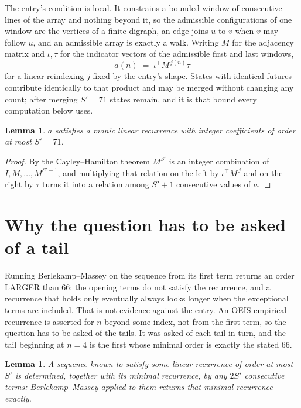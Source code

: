 \documentclass[11pt,a4paper]{article}
\theoremstyle{plain}
\newtheorem{lemma}[theorem]{Lemma}
\theoremstyle{definition}
\begin{document}
The entry's condition is local. It constrains a bounded window of consecutive lines of the
array and nothing beyond it, so the admissible configurations of one window are the vertices of
a finite digraph, an edge joins $u$ to $v$ when $v$ may follow $u$, and an admissible array is
exactly a walk. Writing $M$ for the adjacency matrix and $\iota,\tau$ for the indicator vectors
of the admissible first and last windows,
\[
a(n)\;=\;\iota^{\!\top}M^{\,j(n)}\tau
\]
for a linear reindexing $j$ fixed by the entry's shape. States with identical futures
contribute identically to that product and may be merged without changing any count; after
merging $S'=71$ states remain, and it is that bound every computation below uses.

\begin{lemma}\label{lem:cf}
$a$ satisfies a monic linear recurrence with integer coefficients of order at most $S'=71$.
\end{lemma}

\begin{proof}
By the Cayley--Hamilton theorem $M^{S'}$ is an integer combination of $I,M,\dots,M^{S'-1}$,
and multiplying that relation on the left by $\iota^{\!\top}M^{\,j}$ and on the right by
$\tau$ turns it into a relation among $S'+1$ consecutive values of $a$.
\end{proof}

\section{Why the question has to be asked of a tail}

Running Berlekamp--Massey on the sequence from its first term returns an order LARGER than $66$: the opening terms do not satisfy the recurrence, and a recurrence that holds only eventually always looks longer when the exceptional terms are included. That is not evidence against the entry. An OEIS empirical recurrence is asserted for $n$ beyond some index, not from the first term, so the question has to be asked of the tails. It was asked of each tail in turn, and the tail beginning at $n=4$ is the first whose minimal order is exactly the stated $66$.

\begin{lemma}\label{lem:bm}
A sequence known to satisfy some linear recurrence of order at most $S'$ is determined,
together with its minimal recurrence, by any $2S'$ consecutive terms: Berlekamp--Massey applied
to them returns that minimal recurrence exactly.
\end{lemma}
\end{document}
